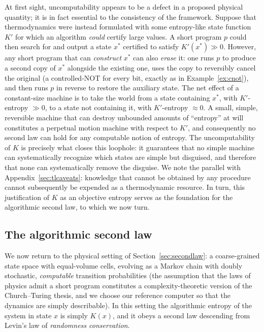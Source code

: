 \documentclass[10pt]{article}
\theoremstyle{definition}
\theoremstyle{remark}
\begin{document}
At first sight, uncomputability appears to be a defect in a proposed physical quantity; it is in fact essential to the consistency of the framework. Suppose that thermodynamics were instead formulated with some entropy-like state function $K'$ for which an algorithm \emph{could} certify large values. A short program $p$ could then search for and output a state $x^*$ certified to satisfy $K'(x^*) \gg 0$. However, any short program that can \emph{construct} $x^*$ can also \emph{erase} it: one runs $p$ to produce a second copy of $x^*$ alongside the existing one, uses the copy to reversibly cancel the original (a controlled-NOT for every bit, exactly as in Example~\ref{ex:cnot}), and then runs $p$ in reverse to restore the auxiliary state. The net effect of a constant-size machine is to take the world from a state containing $x^*$, with $K'$-entropy $\gg 0$, to a state not containing it, with $K'$-entropy $\approx 0$. A small, simple, reversible machine that can destroy unbounded amounts of ``entropy'' at will constitutes a perpetual motion machine with respect to $K'$, and consequently no second law can hold for any computable notion of entropy. The uncomputability of $K$ is precisely what closes this loophole: it guarantees that no simple machine can systematically recognize which states are simple but disguised, and therefore that none can systematically remove the disguise. We note the parallel with Appendix~\ref{sec:tlcaveats}: knowledge that cannot be obtained by any procedure cannot subsequently be expended as a thermodynamic resource. In turn, this justification of $K$ as an objective entropy serves as the foundation for the algorithmic second law, to which we now turn.

\subsection{The algorithmic second law}
\label{sec:algsecondlaw}

We now return to the physical setting of Section~\ref{sec:secondlaw}: a coarse-grained state space with equal-volume cells, evolving as a Markov chain with doubly stochastic, \emph{computable} transition probabilities (the assumption that the laws of physics admit a short program constitutes a complexity-theoretic version of the Church--Turing thesis, and we choose our reference computer so that the dynamics are simply describable). In this setting the algorithmic entropy of the system in state $x$ is simply $K(x)$, and it obeys a second law descending from Levin's law of \emph{randomness conservation}.
\end{document}
